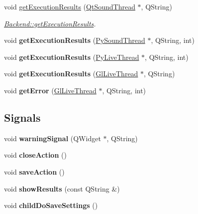 \begin{DoxyCompactItemize}
void \hyperlink{classBackend_a470ae474cf3d91ad5639906bf0786f99}{get\+Execution\+Results} (\hyperlink{classQtSoundThread}{Qt\+Sound\+Thread} $\ast$, Q\+String)
\begin{DoxyCompactList}\small\item\em \hyperlink{classBackend_a470ae474cf3d91ad5639906bf0786f99}{Backend\+::get\+Execution\+Results}. \end{DoxyCompactList}\item 
\hypertarget{classBackend_ac1015a3827ecb51a218bd7407c25e404}{void {\bfseries get\+Execution\+Results} (\hyperlink{classPySoundThread}{Py\+Sound\+Thread} $\ast$, Q\+String, int)}\label{classBackend_ac1015a3827ecb51a218bd7407c25e404}

\item 
\hypertarget{classBackend_a003d57ff15a365ce17c5f9aad70f80cf}{void {\bfseries get\+Execution\+Results} (\hyperlink{classPyLiveThread}{Py\+Live\+Thread} $\ast$, Q\+String, int)}\label{classBackend_a003d57ff15a365ce17c5f9aad70f80cf}

\item 
\hypertarget{classBackend_af71ab9234eada09c515370fe68a2a60c}{void {\bfseries get\+Execution\+Results} (\hyperlink{classGlLiveThread}{Gl\+Live\+Thread} $\ast$, Q\+String)}\label{classBackend_af71ab9234eada09c515370fe68a2a60c}

\item 
\hypertarget{classBackend_ac773069daf1253e45cf1bac598ea07e5}{void {\bfseries get\+Error} (\hyperlink{classGlLiveThread}{Gl\+Live\+Thread} $\ast$, Q\+String, int)}\label{classBackend_ac773069daf1253e45cf1bac598ea07e5}

\end{DoxyCompactItemize}
\subsection*{Signals}
\begin{DoxyCompactItemize}
\item 
\hypertarget{classBackend_a2ac57980d074469c38e7f440010e4902}{void {\bfseries warning\+Signal} (Q\+Widget $\ast$, Q\+String)}\label{classBackend_a2ac57980d074469c38e7f440010e4902}

\item 
\hypertarget{classBackend_a6087c09506cdc2de62e71e07c848f6a4}{void {\bfseries close\+Action} ()}\label{classBackend_a6087c09506cdc2de62e71e07c848f6a4}

\item 
\hypertarget{classBackend_a1442023af58aa9d10895e544612bb148}{void {\bfseries save\+Action} ()}\label{classBackend_a1442023af58aa9d10895e544612bb148}

\item 
\hypertarget{classBackend_ac983ee553561b1fc8f7d6b811c5caefd}{void {\bfseries show\+Results} (const Q\+String \&)}\label{classBackend_ac983ee553561b1fc8f7d6b811c5caefd}

\item 
\hypertarget{classBackend_a9bb0c4a9fc2f93ff78468c60f2d64329}{void {\bfseries child\+Do\+Save\+Settings} ()}\label{classBackend_a9bb0c4a9fc2f93ff78468c60f2d64329}

\end{DoxyCompactItemize}
